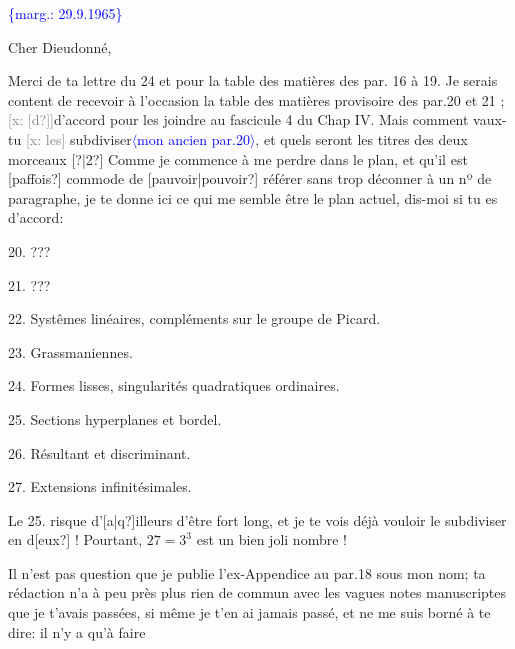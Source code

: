 \documentclass[11pt]{article}
\newcommand{\scanpage}[1]{\par\bigskip\noindent{\small\sffamily[scan #1]}\par}
\newcommand{\mspage}[1]{{\small\sffamily[p.\,#1]}}
\newcommand{\hand}[1]{\textcolor{blue}{#1}}
\newcommand{\inserted}[2][]{\textcolor{blue}{$\langle$#2$\rangle$}}
\newcommand{\margin}[1]{\textcolor{blue}{\{\textsf{marg.:} #1\}}}
\newcommand{\xout}[1]{\textcolor{gray}{[\textsf{x:} #1]}}
\newcommand{\unsure}[1]{[#1?]}
\begin{document}
\mspage{133}

\clearpage
\scanpage{25/134}
\mspage{\hand{37.}}

\margin{29.9.1965}

Cher Dieudonné,

Merci de ta lettre du 24  et pour la table des matières des par.
16 à 19.  Je serais content de recevoir à l'occasion la table des
matières provisoire des par.20 et 21 ;\xout{\unsure{d}}d'accord pour les joindre au
fascicule 4 du Chap IV. Mais comment vaux-tu \xout{les} subdiviser\inserted{mon ancien par.20}, et
quels seront les titres des deux morceaux \unsure{?|2} Comme je commence à me
perdre dans le plan, et qu'il est \unsure{paffois} commode de \unsure{pauvoir|pouvoir} référer
sans trop déconner à un nº de paragraphe, je te donne ici ce qui me
semble être le plan actuel, dis-moi si tu es d'accord:

20.  ???

21.  ???

22.  Systêmes linéaires, compléments sur le groupe de Picard.

23.  Grassmaniennes.

24.  Formes lisses, singularités quadratiques ordinaires.

25.  Sections hyperplanes et bordel.

26.  Résultant et discriminant.

27.  Extensions infinitésimales.

Le 25.  risque d'\unsure{a|q}illeurs d'être fort long, et je te vois déjà
vouloir le subdiviser en d\unsure{eux} !  Pourtant, $27=3^3$ est un bien joli
nombre !

Il n'est pas question que je publie l'ex-Appendice au par.18
sous mon nom; ta rédaction n'a à peu près plus rien de commun avec
les vagues notes manuscriptes que je t'avais passées, si même je t'en
ai jamais passé, et ne me suis borné à te dire: il n'y a qu'à faire

\mspage{\hand{134}}

\clearpage
\scanpage{25/135}
\mspage{38}
\end{document}
